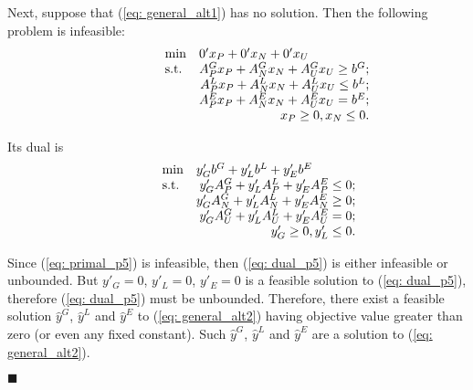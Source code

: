 Next, suppose that (\ref{eq: general_alt1}) has no solution. Then the following problem is infeasible:
\begin{equation}
\label{eq: primal_p5}
  \begin{array}{lrcll}
    \min
    & \multicolumn{4}{l}{0'x_P+0'x_N+0'x_U} \\
    \text{s.t.}
    & A^G_Px_P + A^G_Nx_N + A^G_Ux_U \geq b^G;\\
    & A^L_Px_P + A^L_Nx_N + A^L_Ux_U \leq b^L;\\
    & A^E_Px_P + A^E_Nx_N + A^E_Ux_U = b^E;\\
    & x_P\geq0, x_N\leq0.
  \end{array}
\end{equation}

Its dual is
\begin{equation}
\label{eq: dual_p5}
  \begin{array}{lrcll}
    \min
    & \multicolumn{4}{l}{y'_Gb^G +y'_Lb^L + y'_Eb^E} \\
    \text{s.t.}
    & y'_GA^G_P + y'_LA^L_P + y'_EA^E_P \leq 0;\\
    & y'_GA^G_N + y'_LA^L_N + y'_EA^E_N \geq 0;\\
    & y'_GA^G_U + y'_LA^L_U + y'_EA^E_U = 0;\\
    & y'_G\geq0, y'_L\leq0.
  \end{array}
\end{equation}

Since (\ref{eq: primal_p5}) is infeasible, then (\ref{eq: dual_p5}) is either infeasible or unbounded. But $y'_G=0$, $y'_L=0$, $y'_E=0$ is a feasible solution to (\ref{eq: dual_p5}), therefore (\ref{eq: dual_p5}) must be unbounded. Therefore, there exist a feasible solution $\widehat{y}^G$, $\widehat{y}^L$ and $\widehat{y}^E$ to (\ref{eq: general_alt2}) having objective value greater than zero (or even any fixed constant). Such $\widehat{y}^G$, $\widehat{y}^L$ and $\widehat{y}^E$ are a solution to (\ref{eq: general_alt2}).
\begin{flushright} $\blacksquare$ \end{flushright}